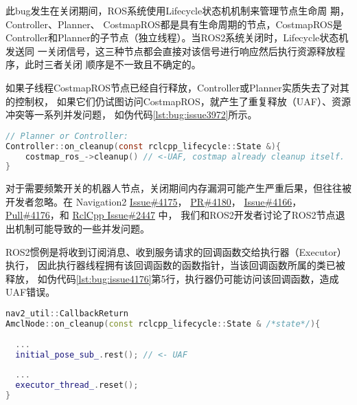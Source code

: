 此bug发生在关闭期间，ROS系统使用Lifecycle状态机机制来管理节点生命周
期，Controller、Planner、 CostmapROS都是具有生命周期的节点，CostmapROS是
Controller和Planner的子节点（独立线程）。当ROS2系统关闭时，Lifecycle状态机发送同
一关闭信号，这三种节点都会直接对该信号进行响应然后执行资源释放程序，此时三者关闭
顺序是不一致且不确定的。

如果子线程CostmapROS节点已经自行释放，Controller或Planner实质失去了对其的控制权，
如果它们仍试图访问CostmapROS，就产生了重复释放（UAF）、资源冲突等一系列并发问题，
如伪代码\ref{lst:bug:issue3972}所示。

\begin{lstlisting}[language=C, caption=漏洞\#3972问题代码, label=lst:bug:issue3972]
// Planner or Controller:
Controller::on_cleanup(const rclcpp_lifecycle::State &){
	costmap_ros_->cleanup() // <-UAF, costmap already cleanup itself.
}
\end{lstlisting}

对于需要频繁开关的机器人节点，关闭期间内存漏洞可能产生严重后果，但往往被开发者忽略。在 Navigation2 
\href{https://github.com/ros-planning/navigation2/issues/4175}{Issue\#4175}，
\href{https://github.com/ros-planning/navigation2/pull/4180}{PR\#4180}，
\href{https://github.com/ros-planning/navigation2/issues/4166}{Issue\#4166}，
\href{https://github.com/ros-planning/navigation2/pull/4176}{Pull\#4176}，和 
\href{https://github.com/ros2/rclcpp/issues/2447}{RclCpp Issue\#2447} 中，
我们和ROS2开发者讨论了ROS2节点退出机制可能导致的一些并发问题。

ROS2惯例是将收到订阅消息、收到服务请求的回调函数交给执行器（Executor）执行，
因此执行器线程拥有该回调函数的函数指针，当该回调函数所属的类已被释放，
如伪代码\ref{lst:bug:issue4176}第5行，执行器仍可能访问该回调函数，造成UAF错误。

\begin{lstlisting}[language=C++, caption=漏洞\#4176问题代码, label=lst:bug:issue4176]
nav2_util::CallbackReturn
AmclNode::on_cleanup(const rclcpp_lifecycle::State & /*state*/){
  
  ...
  initial_pose_sub_.rest(); // <- UAF
  
  ...
  executor_thread_.reset();
}

\end{lstlisting}

